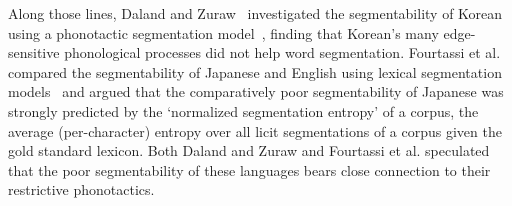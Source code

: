 \documentclass[11pt]{article}
\begin{document}
%
%

Along those lines, Daland and Zuraw~ investigated the segmentability of Korean using a phonotactic segmentation model~\cite{Daland11a}, finding that Korean's many edge-sensitive phonological processes did not help word segmentation. Fourtassi et al.~ compared the segmentability of Japanese and English using lexical segmentation models~\cite{Goldwater09a,Johnson09a} and argued that the comparatively poor segmentability of Japanese was strongly predicted by the `normalized segmentation entropy' of a corpus, the average (per-character) entropy over all licit segmentations of a corpus given the gold standard lexicon. Both Daland and Zuraw and Fourtassi et al. speculated that the poor segmentability of these languages bears close connection to their restrictive phonotactics.
\end{document}
